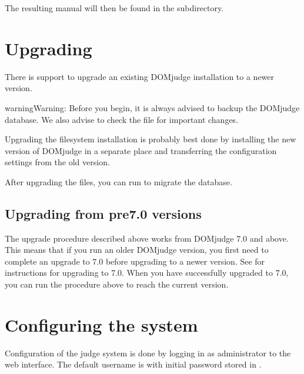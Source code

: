 \documentclass[a4paper,10pt,english,openany]{sphinxmanual}
\begin{document}
\sphinxAtStartPar
The resulting manual will then be found in the  subdirectory.

\sphinxstepscope


\section{Upgrading}
\label{\detokenize{upgrading:upgrading}}\label{\detokenize{upgrading::doc}}
\sphinxAtStartPar
There is support to upgrade an existing DOMjudge installation to
a newer version.

\begin{sphinxadmonition}{warning}{Warning:}
\sphinxAtStartPar
Before you begin, it is always advised to backup the DOMjudge
database. We also advise to check the  file for
important changes.
\end{sphinxadmonition}

\sphinxAtStartPar
Upgrading the filesystem installation is probably best done by
installing the new version of DOMjudge in a separate place and
transferring the configuration settings from the old version.

\sphinxAtStartPar
After upgrading the files, you can run 
to migrate the database.


\subsection{Upgrading from pre\sphinxhyphen{}7.0 versions}
\label{\detokenize{upgrading:upgrading-from-pre-7-0-versions}}
\sphinxAtStartPar
The upgrade procedure described above works from DOMjudge 7.0
and above. This means that if you run an older DOMjudge version,
you first need to complete an upgrade to 7.0 before upgrading to
a newer version. See 
for instructions for upgrading to 7.0. When you have successfully
upgraded to 7.0, you can run the procedure above to reach the
current version.

\sphinxstepscope


\section{Configuring the system}
\label{\detokenize{config-basic:configuring-the-system}}\label{\detokenize{config-basic::doc}}
\sphinxAtStartPar
Configuration of the judge system is done by logging in as administrator
to the web interface.
The default username is  with initial password stored in
.
\end{document}
